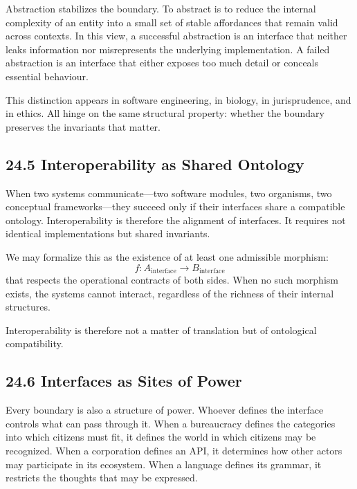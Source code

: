 \documentclass[12pt,letterpaper]{article}
\theoremstyle{remark}
\begin{document}
Abstraction stabilizes the boundary. To abstract is to reduce the internal complexity of an entity into a small set of stable affordances that remain valid across contexts. In this view, a successful abstraction is an interface that neither leaks information nor misrepresents the underlying implementation. A failed abstraction is an interface that either exposes too much detail or conceals essential behaviour.

This distinction appears in software engineering, in biology, in jurisprudence, and in ethics. All hinge on the same structural property: whether the boundary preserves the invariants that matter.

\subsection{24.5 Interoperability as Shared Ontology}

When two systems communicate—two software modules, two organisms, two conceptual frameworks—they succeed only if their interfaces share a compatible ontology. Interoperability is therefore the alignment of interfaces. It requires not identical implementations but shared invariants.

We may formalize this as the existence of at least one admissible morphism:
\[
f: A_{\text{interface}} \to B_{\text{interface}}
\]
that respects the operational contracts of both sides. When no such morphism exists, the systems cannot interact, regardless of the richness of their internal structures.

Interoperability is therefore not a matter of translation but of ontological compatibility.

\subsection{24.6 Interfaces as Sites of Power}

Every boundary is also a structure of power. Whoever defines the interface controls what can pass through it. When a bureaucracy defines the categories into which citizens must fit, it defines the world in which citizens may be recognized. When a corporation defines an API, it determines how other actors may participate in its ecosystem. When a language defines its grammar, it restricts the thoughts that may be expressed.
\end{document}
